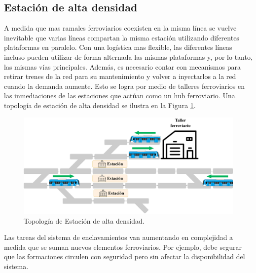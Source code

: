 \subsection{Estación de alta densidad}

A medida que mas ramales ferroviarios coexisten en la misma línea se vuelve inevitable que varias líneas compartan la misma estación utilizando diferentes plataformas en paralelo. Con una logística mas flexible, las diferentes líneas incluso pueden utilizar de forma alternada las mismas plataformas y, por lo tanto, las mismas vías principales. Además, es necesario contar con mecanismos para retirar trenes de la red para su mantenimiento y volver a inyectarlos a la red cuando la demanda aumente. Esto se logra por medio de talleres ferroviarios en las inmediaciones de las estaciones que actúan como un hub ferroviario. Una topología de estación de alta densidad se ilustra en la Figura \ref{fig:hub_1}.

    \begin{figure}[H]
        \centering
        \includegraphics[width=1\textwidth]{Figuras/altaDensidad}
        \centering\caption{Topología de Estación de alta densidad.}
        \label{fig:hub_1}
    \end{figure}
    

Las tareas del sistema de enclavamientos van aumentando en complejidad a medida que se suman nuevos elementos ferroviarios. Por ejemplo, debe segurar que las formaciones circulen con seguridad pero sin afectar la disponibilidad del sistema. %